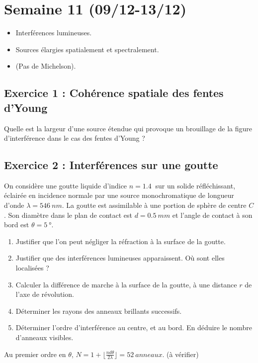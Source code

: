 \section{Semaine 11 (09/12-13/12) }


\begin{itemize}
	\item Interférences lumineuses.
	\item Sources élargies spatialement et spectralement.
	\item (Pas de Michelson).
\end{itemize}

\subsection{Exercice 1 : Cohérence spatiale des fentes d'Young}

Quelle est la largeur d'une source étendue qui provoque un brouillage de la figure d'interférence dans le cas des fentes d'Young ?

\subsection{Exercice 2 : Interférences sur une goutte}

On considère une goutte liquide d'indice $n=\SI{1.4}{}$ sur un solide réfléchissant, éclairée en incidence normale par une source monochromatique de longueur d'onde $\lambda = \SI{546}{nm}$. La goutte est assimilable à une portion de sphère de centre $C$. Son diamètre dans le plan de contact est $d=\SI{0.5}{mm}$ et l'angle de contact à son bord est $\theta = \SI{5}{\degree}$. 

\begin{enumerate}
	\item Justifier que l'on peut négliger la réfraction à la surface de la goutte.
	\item Justifier que des interférences lumineuses apparaissent. Où sont elles localisées ?
	\item Calculer la différence de marche à la surface de la goutte, à une distance $r$ de l'axe de révolution.
	\item Déterminer les rayons des anneaux brillants successifs.
	\item Déterminer l'ordre d'interférence au centre, et au bord. En déduire le nombre d'anneaux visibles.
\end{enumerate}

 Au premier ordre en $\theta$, $N = 1 + \lfloor \frac{n d \theta}{2 \lambda}\rfloor = \SI{52}{anneaux}$. (à vérifier)

